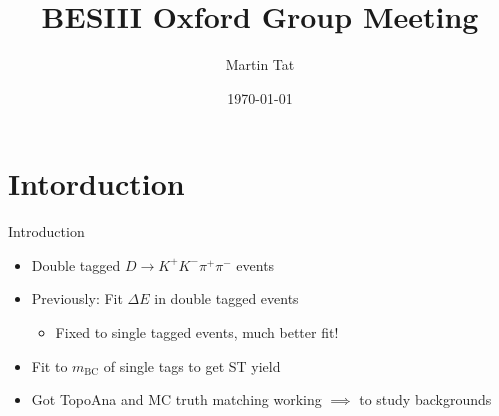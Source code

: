 \documentclass{beamer}
\title[BESIII Oxford]{BESIII Oxford Group Meeting}
\author{Martin Tat}
\institute{Oxford LHCb}
\date{\today}
\begin{document}
\begin{frame}
  \titlepage
\end{frame}


\section{Intorduction}
\begin{frame}{Introduction}
  \begin{itemize}
    \setlength\itemsep{2em}
    \item{Double tagged $D\to K^+K^-\pi^+\pi^-$ events}
    \item{Previously: Fit $\Delta E$ in double tagged events}
    \begin{itemize}
      \item{Fixed to single tagged events, much better fit!}
    \end{itemize}
    \item{Fit to $m_\text{BC}$ of single tags to get ST yield}
    \item{Got TopoAna and MC truth matching working $\implies$ to study backgrounds}
  \end{itemize}
\end{frame}
\end{document}
